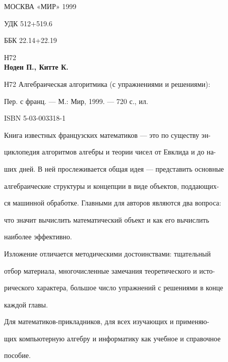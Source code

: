 \documentclass{mai_book}
\begin{document}
\large {МОСКВА «МИР» 1999}
\newpage

УДК 512+519.6

   ББК 22.14+22.19

\hspace{1.0cm} Н72
\\

\hspace{1.0cm} \textbf{Ноден П., Китте К.}

Н72 \hspace{0.5cm} \small {Алгебраическая алгоритмика (с упражнениями и решениями):} 

\hspace{1.0cm} \small {Пер. с франц. — М.: Мир, 1999. — 720 с., ил.}

\hspace{1.5cm} ISBN 5-03-003318-1

\hspace{1.5cm} \small {Книга известных французских математиков — это по существу эн-

\hspace{1.0cm} циклопедия алгоритмов алгебры и теории чисел от Евклида и до на-

\hspace{1.0cm} ших дней. В ней прослеживается общая идея — представить основные

\hspace{1.0cm} алгебраические структуры и концепции в виде объектов, поддающих-

\hspace{1.0cm} ся машинной обработке. Главными для авторов являются два вопроса:

\hspace{1.0cm} что значит вычислить математический объект и как его вычислить

\hspace{1.0cm} наиболее эффективно.

\hspace{1.5cm} Изложение отличается методическими достоинствами: тщательный 

\hspace{1.0cm} отбор материала, многочисленные замечания теоретического и исто-

\hspace{1.0cm} рического характера, большое число упражнений с решениями в конце

\hspace{1.0cm} каждой главы.

\hspace{1.5cm} Для математиков-прикладников, для всех изучающих и применяю-

\hspace{1.0cm} щих компьютерную алгебру и информатику как учебное и справочное 

\hspace{1.0cm} пособие.}
\end{document}
